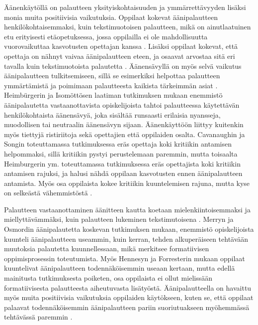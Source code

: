 \documentclass[utf8]{gradu3}
\begin{document}
Äänenkäytöllä on palautteen yksityiskohtaisuuden ja ymmärrettävyyden lisäksi monia muita positiivisia vaikutuksia. Oppilaat kokevat äänipalautteen henkilökohtaisemmaksi, kuin tekstimuotoisen palautteen, mikä on ainutlaatuinen etu erityisesti etäopetuksessa, jossa oppilailla ei ole mahdollisuutta vuorovaikuttaa kasvotusten opettajan kanssa \parencite[][]{using, distanceLearning}. Lisäksi oppilaat kokevat, että opettaja on nähnyt vaivaa äänipalautteen eteen, ja osaavat arvostaa sitä eri tavalla kuin tekstimuotoista palautetta \parencite[][]{listenOrToRead}. Äänensävyllä on myös selvä vaikutus äänipalautteen tulkitsemiseen, sillä se esimerkiksi helpottaa palautteen ymmärtämistä ja poimimaan palautteesta kaikista tärkeimmän asiat \parencite[][]{attitudes}. Heimbürgerin ja Isomöttösen \parencite[][]{moderating} laatiman tutkimuksen mukaan enemmistö äänipalautetta vastaanottavista opiskelijoista tahtoi palautteessa käytettävän henkilökohtaista äänensävyä, joka sisältää runsaasti erilaisia nyansseja, muodollisen tai neutraalin äänensävyn sijaan. Äänenkäyttöön liittyy kuitenkin myös tiettyjä ristiriitoja sekä opettajien että oppilaiden osalta. Cavanaughin ja Songin \parencite[][]{versus} toteuttamassa tutkimuksessa eräs opettaja koki kritiikin antamisen helpommaksi, sillä kritiikin pystyi perustelemaan paremmin, mutta toisaalta Heimburgerin ym. \parencite[][]{academics} toteuttamassa tutkimuksessa eräs opettajista koki kritiikin antamisen rajuksi, ja halusi nähdä oppilaan kasvotusten ennen äänipalautteen antamista. Myös osa oppilaista kokee kritiikin kuuntelemisen rajuna, mutta kyse on selkeästä vähemmistöstä \parencite[][]{voice}. 

Palautteen vastaanottaminen äänitteen kautta koetaan mielenkiintoisemmaksi ja miellyttävämmäksi, kuin palautteen lukeminen tekstimutoisena \parencite[][]{listenOrToRead}. Merryn ja Osmordin \parencite[][]{attitudes} äänipalautetta koskevan tutkimuksen mukaan, enemmistö opiskelijoista kuunteli äänipalautteen useammin, kuin kerran, tehden alkuperäiseen tehtävään muutoksia palautetta kuunnellessaan, mikä merkitsee formatiivisen oppimisprosessin toteutumista. Myös Hennesyn ja Forresterin \parencite[][]{attitudes} mukaan oppilaat kuuntelivat äänipalautteen todennäköisemmin useaan kertaan, mutta edellä mainitusta tutkimuksesta poiketen, osa oppilaista ei ollut mielissään formatiivisesta palautteesta aiheutuvasta lisätyöstä. Äänipalautteella on havaittu myös muita positiivisia vaikutuksia oppilaiden käytökseen, kuten se, että oppilaat palaavat todennäköisemmin äänipalautteen pariin suoriutuakseen myöhemmässä tehtävässä paremmin \parencite[][]{voice}.
\end{document}
